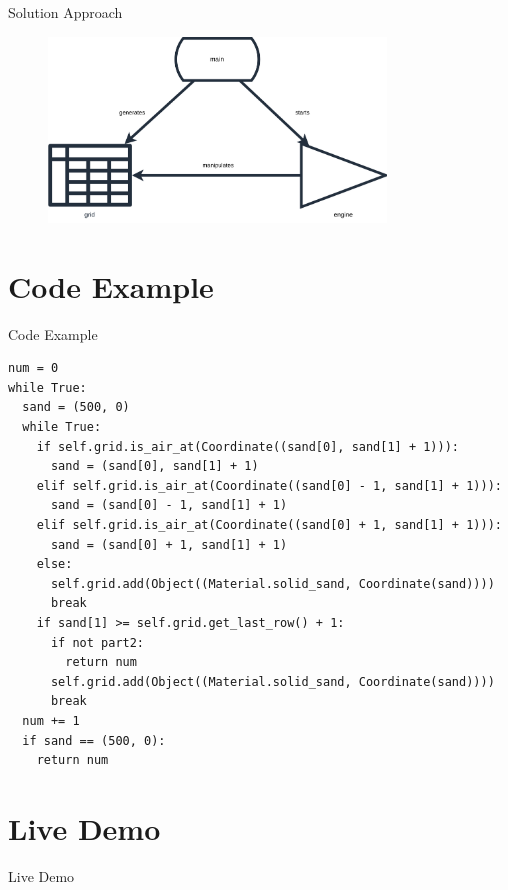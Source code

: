 \documentclass{beamer}
\begin{document}
\begin{frame}{Solution Approach}
    \begin{figure}[H]
        \centering
        \includegraphics[width=0.8\textwidth]{Images/AoC22_14_high_level.png}
    \end{figure}
\end{frame}

\section{Code Example}

\begin{frame}[fragile]{Code Example}
    \begin{verbatim}
num = 0
while True:
  sand = (500, 0)
  while True:
    if self.grid.is_air_at(Coordinate((sand[0], sand[1] + 1))):
      sand = (sand[0], sand[1] + 1)
    elif self.grid.is_air_at(Coordinate((sand[0] - 1, sand[1] + 1))):
      sand = (sand[0] - 1, sand[1] + 1)
    elif self.grid.is_air_at(Coordinate((sand[0] + 1, sand[1] + 1))):
      sand = (sand[0] + 1, sand[1] + 1)
    else:
      self.grid.add(Object((Material.solid_sand, Coordinate(sand))))
      break
    if sand[1] >= self.grid.get_last_row() + 1:
      if not part2:
        return num
      self.grid.add(Object((Material.solid_sand, Coordinate(sand))))
      break
  num += 1
  if sand == (500, 0):
    return num
    \end{verbatim}
\end{frame}

\section{Live Demo}

\begin{frame}{Live Demo}
\end{frame}
\end{document}
